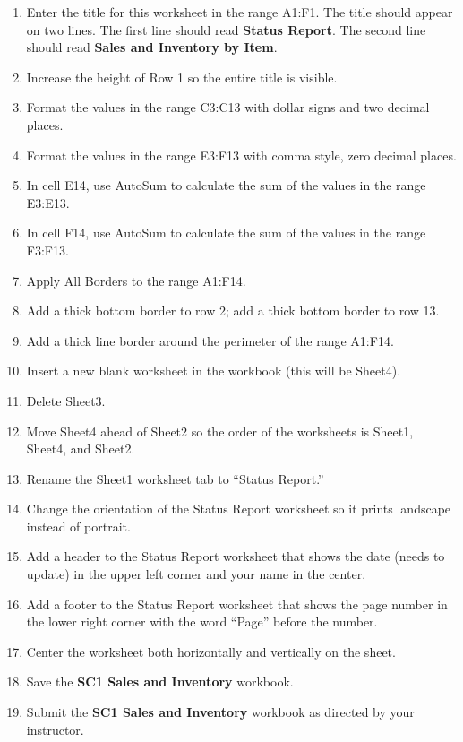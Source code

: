 \begin{enumerate}
	\item Enter the title for this worksheet in the range \textsf{A1:F1}. The title should appear on two lines. The first line should read \textbf{Status Report}. The second line should read \textbf{Sales and Inventory by Item}.
	\item Increase the height of Row 1 so the entire title is visible.
	\item Format the values in the range \textsf{C3:C13} with dollar signs and two decimal places.
	\item Format the values in the range \textsf{E3:F13} with comma style, zero decimal places.
	\item In cell \textsf{E14}, use AutoSum to calculate the sum of the values in the range \textsf{E3:E13}.
	\item In cell \textsf{F14}, use AutoSum to calculate the sum of the values in the range \textsf{F3:F13}.
	\item Apply All Borders to the range \textsf{A1:F14}.
	\item Add a thick bottom border to row 2; add a thick bottom border to row 13.
	\item Add a thick line border around the perimeter of the range \textsf{A1:F14}.
	\item Insert a new blank worksheet in the workbook (this will be Sheet4).
	\item Delete Sheet3.
	\item Move Sheet4 ahead of Sheet2 so the order of the worksheets is Sheet1, Sheet4, and Sheet2.
	\item Rename the Sheet1 worksheet tab to ``Status Report.''
	\item Change the orientation of the Status Report worksheet so it prints landscape instead of portrait.
	\item Add a header to the Status Report worksheet that shows the date (needs to update) in the upper left corner and your name in the center.
	\item Add a footer to the Status Report worksheet that shows the page number in the lower right corner with the word ``Page'' before the number.
	\item Center the worksheet both horizontally and vertically on the sheet.
	\item Save the \textbf{SC1 Sales and Inventory} workbook.
	\item Submit the \textbf{SC1 Sales and Inventory} workbook as directed by your instructor.

\end{enumerate}
